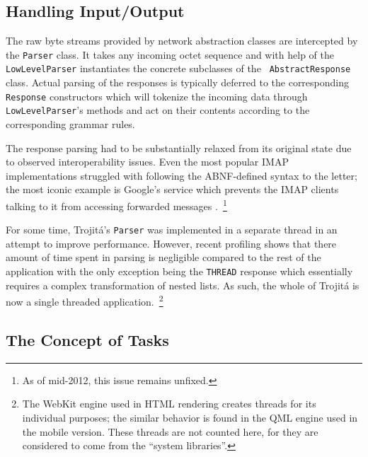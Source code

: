 \documentclass[trojita]{subfiles}
\begin{document}
\subsection{Handling Input/Output}

The raw byte streams provided by network abstraction classes are intercepted by the {\tt Parser} class.  It takes any
incoming octet sequence and with help of the {\tt LowLevelParser} instantiates the concrete subclasses of the {\tt
AbstractResponse} class.  Actual parsing of the responses is typically deferred to the corresponding {\tt Response}
constructors which will tokenize the incoming data through {\tt LowLevelParser}'s methods and act on their contents
according to the corresponding grammar rules.

The response parsing had to be substantially relaxed from its original state due to observed interoperability issues.
Even the most popular IMAP implementations struggled with following the ABNF-defined \cite{rfc5234} syntax to the
letter; the most iconic example is Google's service which prevents the IMAP clients talking to it from accessing
forwarded messages \cite{gmail-bodystructure-sucks}.~\footnote{As of mid-2012, this issue remains unfixed.}

For some time, Trojitá's {\tt Parser} was implemented in a separate thread in an attempt to improve performance.
However, recent profiling shows that there amount of time spent in parsing is negligible compared to the rest of the
application with the only exception being the {\tt THREAD} response which essentially requires a complex transformation
of nested lists.  As such, the whole of Trojitá is now a single threaded application.~\footnote{The WebKit engine used
in HTML rendering creates threads for its individual purposes; the similar behavior is found in the QML engine used in
the mobile version.  These threads are not counted here, for they are considered to come from the ``system libraries''.}

\subsection{The Concept of Tasks}
\end{document}
